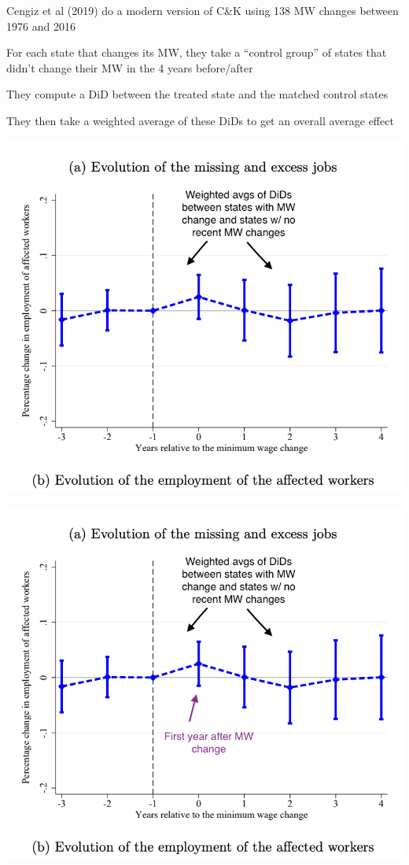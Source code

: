 \documentclass[11pt,english,handout]{beamer}
\newenvironment{wideitemize}{\itemize\addtolength{\itemsep}{10pt}}{\enditemize}
\begin{document}
\begin{frame}
	\begin{wideitemize}
		\item
		Cengiz et al (2019) do a modern version of C\&K using 138 MW changes between 1976 and 2016
		
		\pause
		\item
		For each state that changes its MW, they take a ``control group'' of states that didn't change their MW in the 4 years before/after 
		
		\pause
		\item
		They compute a DiD between the treated state and the matched control states
		
		\pause
		\item
		They then take a weighted average of these DiDs to get an overall average effect
	\end{wideitemize}
\end{frame}


\begin{frame}
	\includegraphics[width =0.9 \linewidth]{cengiz_eventstudy}
\end{frame}


\begin{frame}
	\includegraphics[width =0.9 \linewidth]{cengiz_eventstudy2}
\end{frame}
\end{document}

